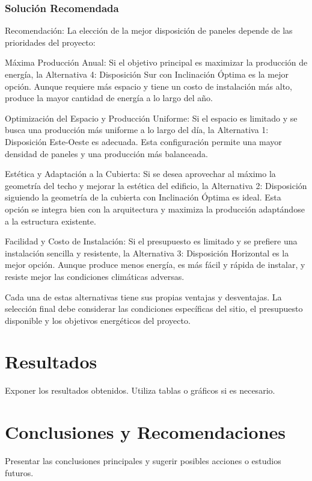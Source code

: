 \documentclass[a4paper,12pt]{article}
\begin{document}
\begin{Form}
\subsubsection*{Solución Recomendada}

Recomendación: La elección de la mejor disposición de paneles depende de las prioridades del proyecto:

Máxima Producción Anual: Si el objetivo principal es maximizar la producción de energía, la Alternativa 4: Disposición Sur con Inclinación Óptima es la mejor opción. Aunque requiere más espacio y tiene un costo de instalación más alto, produce la mayor cantidad de energía a lo largo del año.

Optimización del Espacio y Producción Uniforme: Si el espacio es limitado y se busca una producción más uniforme a lo largo del día, la Alternativa 1: Disposición Este-Oeste es adecuada. Esta configuración permite una mayor densidad de paneles y una producción más balanceada.

Estética y Adaptación a la Cubierta: Si se desea aprovechar al máximo la geometría del techo y mejorar la estética del edificio, la Alternativa 2: Disposición siguiendo la geometría de la cubierta con Inclinación Óptima es ideal. Esta opción se integra bien con la arquitectura y maximiza la producción adaptándose a la estructura existente.

Facilidad y Costo de Instalación: Si el presupuesto es limitado y se prefiere una instalación sencilla y resistente, la Alternativa 3: Disposición Horizontal es la mejor opción. Aunque produce menos energía, es más fácil y rápida de instalar, y resiste mejor las condiciones climáticas adversas.

Cada una de estas alternativas tiene sus propias ventajas y desventajas. La selección final debe considerar las condiciones específicas del sitio, el presupuesto disponible y los objetivos energéticos del proyecto.


\section{Resultados}
Exponer los resultados obtenidos. Utiliza tablas o gráficos si es necesario.

\section{Conclusiones y Recomendaciones}
Presentar las conclusiones principales y sugerir posibles acciones o estudios futuros.


\end{Form}
\end{document}
